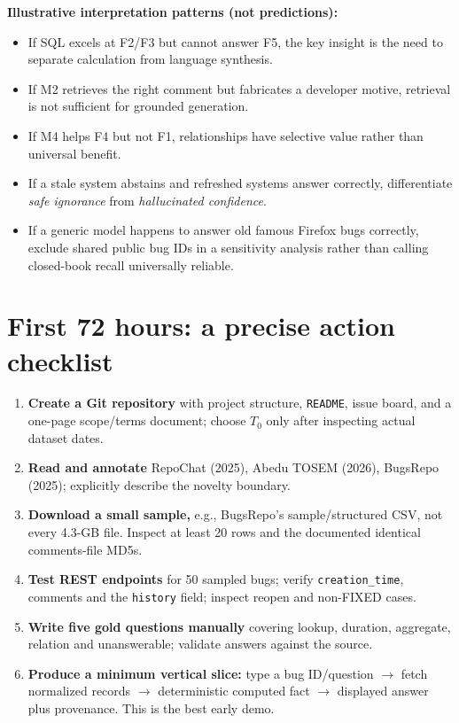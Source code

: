 \documentclass[11pt,a4paper]{article}
\begin{document}
\textbf{Illustrative interpretation patterns (not predictions):}
\begin{itemize}
\item If SQL excels at F2/F3 but cannot answer F5, the key insight is the need to separate calculation from language synthesis.
\item If M2 retrieves the right comment but fabricates a developer motive, retrieval is not sufficient for grounded generation.
\item If M4 helps F4 but not F1, relationships have selective value rather than universal benefit.
\item If a stale system abstains and refreshed systems answer correctly, differentiate \emph{safe ignorance} from \emph{hallucinated confidence}.
\item If a generic model happens to answer old famous Firefox bugs correctly, exclude shared public bug IDs in a sensitivity analysis rather than calling closed-book recall universally reliable.
\end{itemize}

\section{First 72 hours: a precise action checklist}
\begin{enumerate}
\item \textbf{Create a Git repository} with project structure, \texttt{README}, issue board, and a one-page scope/terms document; choose $T_0$ only after inspecting actual dataset dates.
\item \textbf{Read and annotate} RepoChat (2025), Abedu TOSEM (2026), BugsRepo (2025); explicitly describe the novelty boundary.
\item \textbf{Download a small sample,} e.g., BugsRepo's sample/structured CSV, not every 4.3-GB file. Inspect at least 20 rows and the documented identical comments-file MD5s.
\item \textbf{Test REST endpoints} for 50 sampled bugs; verify \texttt{creation\_time}, comments and the \texttt{history} field; inspect reopen and non-FIXED cases.
\item \textbf{Write five gold questions manually} covering lookup, duration, aggregate, relation and unanswerable; validate answers against the source.
\item \textbf{Produce a minimum vertical slice:} type a bug ID/question $\rightarrow$ fetch normalized records $\rightarrow$ deterministic computed fact $\rightarrow$ displayed answer plus provenance. This is the best early demo.
\end{enumerate}
\end{document}
